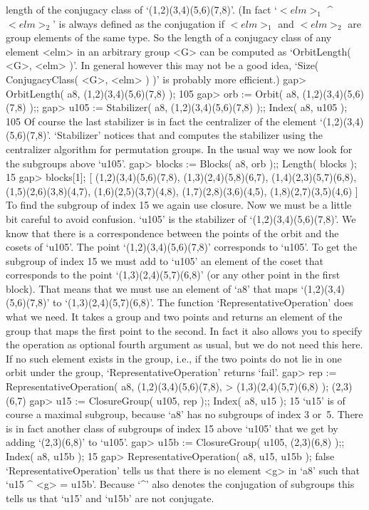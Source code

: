 length of  the  conjugacy   class of  `(1,2)(3,4)(5,6)(7,8)'.   (In  fact
`$<elm>_1$ ^ $<elm>_2$' is always defined as the conjugation if $<elm>_1$
and $<elm>_2$ are group elements  of the same  type. So  the length of  a
conjugacy  class of any  element <elm> in an   arbitrary group <G> can be
computed as `OrbitLength( <G>, <elm> )'.  In general however this may not
be a good  idea, `Size( ConjugacyClass( <G>,  <elm> ) )' is probably more
efficient.)
\beginexample
    gap> OrbitLength( a8, (1,2)(3,4)(5,6)(7,8) );
    105
    gap> orb := Orbit( a8, (1,2)(3,4)(5,6)(7,8) );;
    gap> u105 := Stabilizer( a8, (1,2)(3,4)(5,6)(7,8) );; Index( a8, u105 );
    105 
\endexample
Of course the  last stabilizer is in  fact the centralizer of the element
`(1,2)(3,4)(5,6)(7,8)'.  `Stabilizer' notices    that and computes    the
stabilizer using the centralizer algorithm for permutation groups. In the
usual way we now look for the subgroups above `u105'.
\beginexample
    gap> blocks := Blocks( a8, orb );; Length( blocks );
    15
    gap> blocks[1];
    [ (1,2)(3,4)(5,6)(7,8), (1,3)(2,4)(5,8)(6,7), (1,4)(2,3)(5,7)(6,8),
      (1,5)(2,6)(3,8)(4,7), (1,6)(2,5)(3,7)(4,8), (1,7)(2,8)(3,6)(4,5),
      (1,8)(2,7)(3,5)(4,6) ]
\endexample
To find the subgroup of index 15 we  again use closure. Now  we must be a
little bit  careful to avoid    confusion. `u105' is the  stabilizer   of
`(1,2)(3,4)(5,6)(7,8)'. We  know  that there is  a correspondence between
the  points  of  the   orbit and  the   cosets  of  `u105'.   The   point
`(1,2)(3,4)(5,6)(7,8)' corresponds   to `u105'.  To get  the  subgroup of
index 15 we  must add to `u105' an  element of the coset that corresponds
to the   point `(1,3)(2,4)(5,7)(6,8)' (or any other   point  in the first
block).  That means   that  we must  use  an  element of `a8'  that  maps
`(1,2)(3,4)(5,6)(7,8)' to  `(1,3)(2,4)(5,7)(6,8)'.        The    function
`RepresentativeOperation'   does what we need. It   takes a group and two
points and returns an  element of the group that  maps the first point to
the   second. In fact it   also allows you  to   specify the operation as
optional fourth argument as usual,  but we do  not need this here. If  no
such element exists in the  group, i.e., if the  two points do not lie in
one orbit under the group, `RepresentativeOperation' returns `fail'.
\beginexample
    gap> rep := RepresentativeOperation( a8, (1,2)(3,4)(5,6)(7,8),
    >                                        (1,3)(2,4)(5,7)(6,8) );
    (2,3)(6,7)
    gap> u15 := ClosureGroup( u105, rep );; Index( a8, u15 );
    15 
\endexample
`u15' is of course a maximal  subgroup, because `a8'  has no subgroups of
index 3 or~5.  There is in fact  another  class of subgroups  of index 15
above `u105' that we get by adding `(2,3)(6,8)' to `u105'.
\beginexample
    gap> u15b := ClosureGroup( u105, (2,3)(6,8) );; Index( a8, u15b );
    15 
    gap> RepresentativeOperation( a8, u15, u15b );
    false 
\endexample
`RepresentativeOperation' tells us that  there is no  element <g> in `a8'
such that `u15 ^ <g> = u15b'. Because `^' also denotes the conjugation of
subgroups this tells us  that  `u15' and  `u15b' are not  conjugate.

